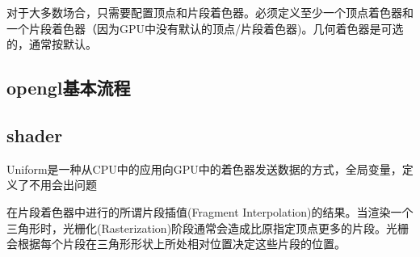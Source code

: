 \documentclass[UTF8]{article}
\begin{document}
对于大多数场合，只需要配置顶点和片段着色器。必须定义至少一个顶点着色器和一个片段着色器（因为GPU中没有默认的顶点/片段着色器)。几何着色器是可选的，通常按默认。

\subsection{opengl基本流程}
\begin{comment}
    // opengl程序流程
/*
    // :: 初始化代码（只运行一次,除非物体频繁改变） ::
    // 1. 绑定顶点数组对象VAO
    glBindVertexArray(VAO);
    // 2. 把顶点数组复制到缓冲中供OpenGL使用
    glBindBuffer(GL_ARRAY_BUFFER, VBO);
    glBufferData(GL_ARRAY_BUFFER, sizeof(vertices), vertices, GL_STATIC_DRAW);
    // 3. 复制索引数组到一个索引缓冲中供OpenGL使用
    glBindBuffer(GL_ELEMENT_ARRAY_BUFFER, EBO);
    glBufferData(GL_ELEMENT_ARRAY_BUFFER, sizeof(indices), indices, GL_STATIC_DRAW);
    // 4. 设置顶点属性指针
    glVertexAttribPointer(0, 3, GL_FLOAT, GL_FALSE, 3 * sizeof(float), (void*)0);
    glEnableVertexAttribArray(0);

    [...]

    // :: 绘制代码（渲染循环中） :: 
    // 5. 绘制物体
    glUseProgram(shaderProgram);
    glBindVertexArray(VAO);
    glDrawElements(GL_TRIANGLES, 6, GL_UNSIGNED_INT, 0)
    glBindVertexArray(0);

*/


\end{comment}


\subsection{shader}
\begin{comment}
    // 着色器结构
/*
    #version version_number
    in type in_variable_name;//每个输入变量叫顶点属性(Vertex Attribute)
    //OpenGL确保至少有16个包含4分量的顶点属性可用.以下三行注释代码可查询具体的顶点属性个数
    //int nrAttributes;
    //glGetIntegerv(GL_MAX_VERTEX_ATTRIBS, &nrAttributes);
    //std::cout << "Maximum nr of vertex attributes supported: " << nrAttributes << std::endl;

    in type in_variable_name;

    out type out_variable_name;

    uniform type uniform_name;

    int main()
    {
    // 处理输入并进行一些图形操作
    ...
    // 输出处理过的结果到输出变量
    out_variable_name = weird_stuff_we_processed;
    }

*/
\end{comment}
Uniform是一种从CPU中的应用向GPU中的着色器发送数据的方式，全局变量，定义了不用会出问题


在片段着色器中进行的所谓片段插值(Fragment Interpolation)的结果。当渲染一个三角形时，光栅化(Rasterization)阶段通常会造成比原指定顶点更多的片段。光栅会根据每个片段在三角形形状上所处相对位置决定这些片段的位置。
\end{document}

